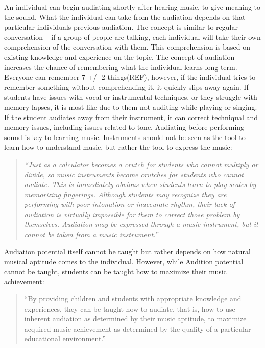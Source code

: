 	An individual can begin audiating shortly after hearing music, to give meaning to the sound. What the individual can take from the audiation depends on that particular individuals previous audiation. The concept is similar to regular conversation – if a group of people are talking, each individual will take their own comprehension of the conversation with them. This comprehension is based on existing knowledge and experience on the topic. 
	The concept of audiation increases the chance of remembering what the individual learns long term. Everyone can remember 7 +/- 2 things(REF), however, if the individual tries to remember something without comprehending it, it quickly slips away again. If students have issues with vocal or instrumental techniques, or they struggle with memory lapses, it is most like due to them not auditing while playing or singing. If the student audiates away from their instrument, it can correct techniqual and memory issues, including issues related to tone. Audiating before performing sound is key to learning music. Instruments should not be seen as the tool to learn how to understand music, but rather the tool to express the music:\\
	
	\begin{quote}
	\textit{“Just as a calculator becomes a crutch for students who cannot multiply or divide, so music instruments become crutches for students who cannot audiate. This is immediately obvious when students learn to play scales by memorizing fingerings. Although students may recognize they are performing with poor intonation or inaccurate rhythm, their lack of audiation is virtually impossible for them to correct those problem by themselves. Audiation may be expressed through a music instrument, but it cannot be taken from a music instrument.”}\\
    \end{quote}

	Audiation potential itself cannot be taught but rather depends on how natural musical aptitude comes to the individual. However, while Audition potential cannot be taught, students can be taught how to maximize their music achievement:\\
	
	\begin{quote}
	“By providing children and students with appropriate knowledge and experiences, they can be taught how to audiate, that is, how to use inherent audiation as determined by their music aptitude, to maximize acquired music achievement as determined by the quality of a particular educational environment.”\\
	\end{quote}

